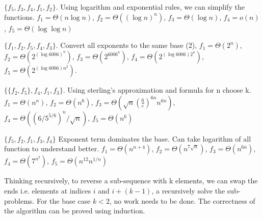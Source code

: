 \documentclass[12pt,twoside]{article}
\begin{document}


\begin{problems}

\problem  %

\begin{problemparts}
\problempart \(\{f_5, f_3, f_4, f_1, f_2\}\). Using logarithm and exponential rules, we can simplify the functions. $f_1 = \Theta(n\log n)$, $f_2 = \Theta((\log n)^n)$, $f_3 = \Theta(\log n)$, $f_4 = o(n)$, $f_5 = \Theta(\log \log n)$

\problempart \(\{f_1, f_2, f_5, f_4, f_3\}\). Convert all exponents to the same base (2), $f_1 = \Theta(2^n)$, $f_2 = \Theta(2^{{(\log{6006})}^n})$, $f_3 = \Theta(2^{6006^n})$, $f_4 = \Theta(2^{{(\log {6006})} {2^n}})$, $f_5 = \Theta(2^{(\log{6006}){n^2}})$.

\problempart \(\{\{f_2, f_5\}, f_4, f_1, f_3\}\). Using sterling's approximation and formula for n choose k. $f_1 = \Theta(n^n)$, $f_2 = \Theta(n^6)$, $f_3 = \Theta(\sqrt n {\left ( \frac {6}{e} \right )}^{6n} n^{6n})$, $f_4 = \Theta({(6/5^{5/6})}^n/\sqrt n)$, $f_5 = \Theta(n^6)$ 

\problempart \(\{f_5, f_2, f_1, f_3, f_4\}\) Exponent term dominates the base. Can take logarithm of all function to understand better. $f_1 = \Theta(n^{n+4})$, $f_2 = \Theta(n^{7 \sqrt n})$, $f_3 = \Theta(n^{6n})$, $f_4 = \Theta(7^{n^2})$, $f_5 = \Theta(n^{12} n^{1/n})$

\end{problemparts}

\newpage
\problem  %

\begin{problemparts}
\problempart %


Thinking recursively, to reverse a sub-sequence with k elements, we can swap the ends i.e. elements at indices $i$ and $i+(k-1)$, a recursively solve the sub-problems. For the base case $k<2$, no work needs to be done. The correctness of the algorithm can be proved using induction.


\end{problemparts}
\end{problems}
\end{document}

